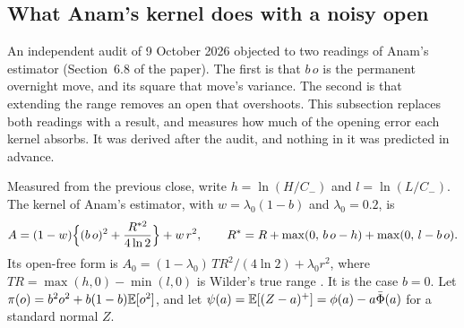 \subsection{What Anam's kernel does with a noisy open}\label{sec:kernel}

An independent audit of 9 October 2026 objected to two readings of Anam's estimator (Section~6.8 of
the paper). The first is that $b\,o$ is the permanent overnight move, and its square that move's
variance. The second is that extending the range removes an open that overshoots. This subsection
replaces both readings with a result, and measures how much of the opening error each kernel
absorbs. It was derived after the audit, and nothing in it was predicted in advance.

Measured from the previous close, write $h=\ln(H/C_{-})$ and $l=\ln(L/C_{-})$. The kernel of
Anam's estimator, with $w=\lambda_0(1-b)$ and $\lambda_0=0.2$, is
\begin{equation}\label{eq:kernel}
  A=(1-w)\Bigl\{(b\,o)^2+\frac{R^{*2}}{4\ln2}\Bigr\}+w\,r^2,\qquad
  R^*=R+\max(0,\,b\,o-h)+\max(0,\,l-b\,o).
\end{equation}
Its open-free form is $A_0=(1-\lambda_0)\,TR^2/(4\ln2)+\lambda_0r^2$, where
$TR=\max(h,0)-\min(l,0)$ is Wilder's true range \citep{Wilder1978}. It is the case $b=0$. Let
$\pi(o)=b^2o^2+b(1-b)\mathbb{E}[o^2]$, and let $\psi(a)=\mathbb{E}[(Z-a)^+]=\phi(a)-a\bar\Phi(a)$ for a standard
normal $Z$.

